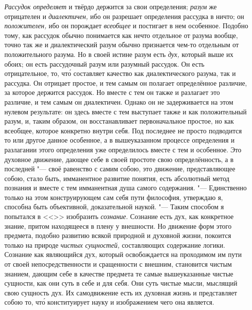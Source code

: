 {\em Рассудок определяет} и твёрдо держится за свои определения; {\em разум} же
отрицателен и {\em диалектичен,} ибо он разрешает определения рассудка в ничто;
он {\em положителен,} ибо он порождает {\em всеобщее} и постигает в нем
особенное. Подобно тому, как рассудок обычно понимается как нечто отдельное от
разума вообще, точно так же и диалектический разум обычно признается чем-то
отдельным от положительного разума. Но в своей истине разум есть {\em дух,}
который выше их обоих; он есть рассудочный разум или разумный рассудок. Он есть
отрицательное, то, чт\'{о} составляет качество как диалектического разума, так
и рассудка. Он отрицает простое, и тем самым он полагает определённое различие,
за которое держится рассудок. Но вместе с тем он также и разлагает это
различие, и тем самым он диалектичен. Однако он не задерживается на этом
нулевом результате: он здесь вместе с тем выступает также и как положительный
разум, и, таким образом, он восстанавливает первоначальное простое, но как
всеобщее, которое конкретно внутри себя. Под последнее не просто подводится то
или другое данное особенное, а в вышеуказанном процессе определения и
разлагании этого определения уже определилось вместе с тем и особенное. Это
духовное движение, дающее себе в своей простоте свою определённость, а в
последней "--- своё равенство с самим собою, это движение, представляющее
собою, стало быть, имманентное развитие понятия, есть абсолютный метод познания
и вместе с тем имманентная душа самого содержания. "--- Единственно только на
этом конструирующем сам себя пути философия, утверждаю я, способна быть
объективной, доказательной наукой. "--- Таким способом я попытался в
<<>> изобразить {\em сознание}. Сознание есть дух, как
конкретное знание, притом находящееся в плену у внешности. Но движение форм
этого предмета, подобно развитию всякой природной и духовной жизни, покоится
только на природе {\em чистых сущностей,} составляющих содержание логики.
Сознание как являющийся дух, который освобождается на проходимом им пути от
своей непосредственности и сращенности с внешним, становится чистым знанием,
дающим себе в качестве предмета те самые вышеуказанные чистые сущности, как они
суть в себе и для себя. Они суть чистые мысли, мыслящий свою сущность дух. Их
самодвижение есть их духовная жизнь и представляет собою то, чт\'{о}
конституирует науку и изображением чего она является.

